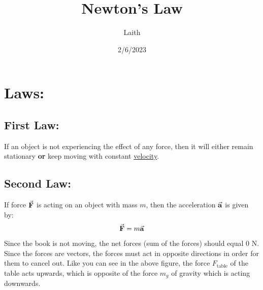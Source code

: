 \documentclass{article}
\title{Newton's Law}
\date{2/6/2023}
\author{Laith}
\begin{document}
\maketitle

\section{Laws:}

\subsection*{First Law:}
    If an object is not experiencing the effect of any 
    force, then it will either remain stationary \textbf{or}
    keep moving with constant \underline{velocity}.

\subsection*{Second Law:}
    If force $\va{F}$ is acting on an object with 
    mass $m$, then the acceleration $\va{a}$ is given by:
    \[\va{F}=m\va{a}\]

\begin{figure}[H]
\end{figure}

Since the book is not moving, the net forces (sum of the forces) 
should equal 0 N. Since the forces are vectors, the forces must act 
in opposite directions in order for them to cancel out. Like you 
can see in the above figure, the force $F_\mathrm{table}$ of the table acts upwards, 
which is opposite of the force $m_g$ of gravity which is acting 
downwards. 
\end{document}
